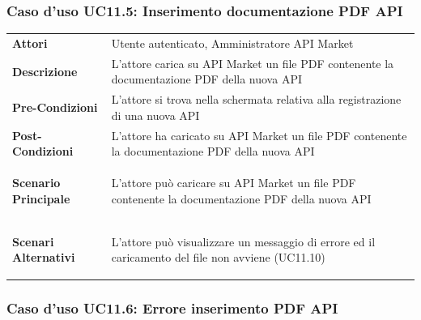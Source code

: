 \subsubsection{Caso d'uso UC11.5: Inserimento documentazione PDF API}
\label{UC11_5}

\begin{minipage}{\linewidth}
	\begin{tabular}{ l | p{11cm}}
		\hline
		\rowcolor{Gray}
		\multicolumn{2}{c}{UC11.5 - Inserimento documentazione PDF API} \\
		\hline
		\textbf{Attori} & Utente autenticato, Amministratore API Market \\
		\textbf{Descrizione} & L'attore carica su API Market un file PDF contenente la documentazione PDF della nuova API \\
		\textbf{Pre-Condizioni} & L'attore si trova nella schermata relativa alla registrazione di una nuova API \\
		\textbf{Post-Condizioni} & L'attore ha caricato su API Market un file PDF contenente la documentazione PDF della nuova API \\
		\textbf{Scenario Principale} & 
		\begin{enumerate*}[label=(\arabic*.),itemjoin={\newline}]
			\item L'attore può caricare su API Market un file PDF contenente la documentazione PDF della nuova API
		\end{enumerate*}\\
		\textbf{Scenari Alternativi} & 
		\begin{enumerate*}[label=(\arabic*.),itemjoin={\newline}]
		\item L'attore può visualizzare un messaggio di errore ed il caricamento del file non avviene (UC11.10)
		\end{enumerate*}\\
	\end{tabular}
\end{minipage}

\subsubsection{Caso d'uso UC11.6: Errore inserimento PDF API}
\label{UC11_6}

